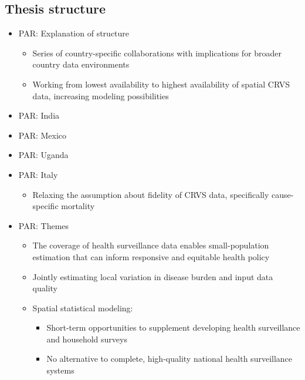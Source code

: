 \documentclass[
]{article}
\providecommand{\tightlist}{%
  \setlength{\itemsep}{0pt}\setlength{\parskip}{0pt}}
\begin{document}
\hypertarget{thesis-structure}{%
\subsection{Thesis structure}\label{thesis-structure}}

\begin{itemize}
\item
  PAR: Explanation of structure

  \begin{itemize}
  \tightlist
  \item
    Series of country-specific collaborations with implications for broader country
    data environments
  \item
    Working from lowest availability to highest availability of spatial CRVS data,
    increasing modeling possibilities
  \end{itemize}
\item
  PAR: India
\item
  PAR: Mexico
\item
  PAR: Uganda
\item
  PAR: Italy

  \begin{itemize}
  \tightlist
  \item
    Relaxing the assumption about fidelity of CRVS data, specifically cause-specific
    mortality
  \end{itemize}
\item
  PAR: Themes

  \begin{itemize}
  \tightlist
  \item
    The coverage of health surveillance data enables small-population estimation that can inform responsive and equitable health policy
  \item
    Jointly estimating local variation in disease burden and input data quality
  \item
    Spatial statistical modeling:

    \begin{itemize}
    \tightlist
    \item
      Short-term opportunities to supplement developing health surveillance and household surveys
    \item
      No alternative to complete, high-quality national health surveillance systems
    \end{itemize}
  \end{itemize}
\end{itemize}
\end{document}
